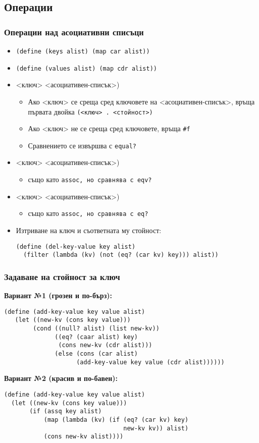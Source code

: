 \documentclass{beamer}
\begin{document}
\subsection{Операции}

\begin{frame}[fragile]
  \frametitle{Операции над асоциативни списъци}

  \begin{itemize}[<+->]
  \item \tt{(define (keys alist) (map car alist))}
  \item \tt{(define (values alist) (map cdr alist))}
  \item {}<ключ> <асоциативен-списък>\tta)
    \begin{itemize}[<.->]
    \item Ако <ключ> се среща сред ключовете на <асоциативен-списък>,
      връща първата двойка \tt(<ключ> \tt. <стойност>\tt)
    \item Ако <ключ> не се среща сред ключовете, връща \tt{\#f}
    \item Сравнението се извършва с \tt{equal?}
    \end{itemize}
  \item {}<ключ> <асоциативен-списък>\tta)
    \begin{itemize}[<.->]
    \item също като \tt{assoc}, но сравнява с \tt{eqv?}
    \end{itemize}
  \item {}<ключ> <асоциативен-списък>\tta)
    \begin{itemize}[<.->]
    \item също като \tt{assoc}, но сравнява с \tt{eq?}
    \end{itemize}
  \item Изтриване на ключ и съответната му стойност:\\
    \onslide<+->
\begin{verbatim}
(define (del-key-value key alist)
  (filter (lambda (kv) (not (eq? (car kv) key))) alist))
\end{verbatim}
  \end{itemize}
\end{frame}

\begin{frame}[fragile]
  \frametitle{Задаване на стойност за ключ}
\small
  \textbf{Вариант №1 (грозен и по-бърз):}
\begin{verbatim}
(define (add-key-value key value alist)
   (let ((new-kv (cons key value)))
        (cond ((null? alist) (list new-kv))
              ((eq? (caar alist) key)
               (cons new-kv (cdr alist)))
              (else (cons (car alist)
                    (add-key-value key value (cdr alist))))))
\end{verbatim}
  \pause
  \textbf{Вариант №2 (красив и по-бавен):}
\begin{verbatim}
(define (add-key-value key value alist)
  (let ((new-kv (cons key value)))
       (if (assq key alist)
           (map (lambda (kv) (if (eq? (car kv) key)
                                 new-kv kv)) alist)
           (cons new-kv alist))))
\end{verbatim}
\end{frame}
\end{document}
